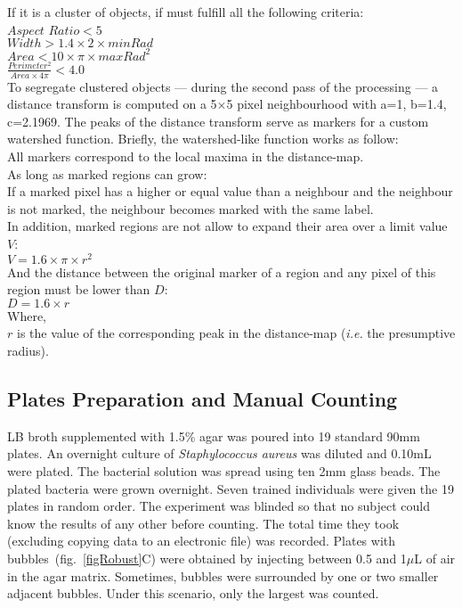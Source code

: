 \documentclass[10pt]{article}
\newcommand{\N}{Seven}
\newcommand{\sa}{\emph{Staphylococcus aureus}}
\begin{document}
If it is a cluster of objects, if must fulfill all the following criteria:\\
\newline{}
$Aspect$ $Ratio < 5$\\
$Width > 1.4\times{}2\times{}minRad $\\
$Area < 10 \times{}\pi\times{}{maxRad}^2$\\
$\frac{Perimeter^2}{Area \times{} 4\pi } < 4.0$
\newline{}\\
\cite{vokes_using_2008}
To segregate clustered objects --- during the second pass of the processing ---
a distance transform is computed on a 5$\times{}$5 pixel neighbourhood with a=1, b=1.4, c=2.1969. 
The peaks of the distance transform serve as markers for a custom watershed
function. Briefly, the watershed-like function works as follow:\\
All markers correspond to the local maxima in the distance-map.\\
As long as marked regions can grow:\\  
If a marked pixel has a higher or equal value than a neighbour and the neighbour
is not marked, the neighbour becomes marked with the same label.\\
In addition, marked regions are not allow to expand their area over a limit value $V$:\\
 $V = 1.6\times{}\pi\times{}{r}^2$ \\
 And the distance between the original marker of a region and any pixel of this region must be lower than $D$:\\
 $D = 1.6\times{}{r}$\\
 \newline{}
 Where,\\
 $r$ is the value of the corresponding peak in the distance-map (\emph{i.e.} the
 presumptive radius).
 

\subsection*{Plates Preparation and Manual Counting}
LB broth supplemented with 1.5\% agar was poured into 19 standard 90mm plates.
An overnight culture of \sa{} was diluted and 0.10mL were plated. The bacterial
solution was spread using ten 2mm glass beads. The plated bacteria were grown
overnight.
\N{} trained individuals were given the 19 plates in random order. The
experiment was blinded so that no subject could know the results of any other before counting.
The total time they took (excluding copying data to an electronic file) was
recorded.
Plates with bubbles~(fig.~\ref{figRobust}C) were obtained by injecting between 0.5 and 1$\mu{}$L of air in the agar matrix.
Sometimes, bubbles were surrounded by one or two smaller adjacent bubbles. Under this scenario, only the largest was counted.
\end{document}
